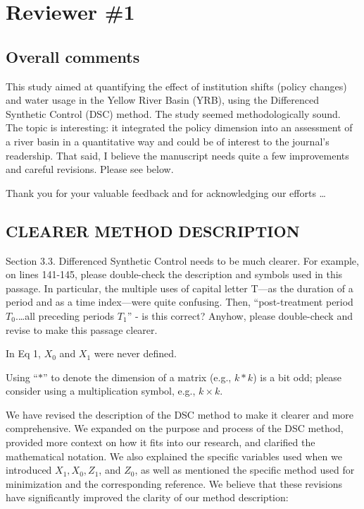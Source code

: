 \section{Reviewer \#1}\label{reviewer_1}

\subsection*{Overall comments}

\RC{} This study aimed at quantifying the effect of institution shifts (policy changes) and water usage in the Yellow River Basin (YRB), using the Differenced Synthetic Control (DSC) method. The study seemed methodologically sound. The topic is interesting: it integrated the policy dimension into an assessment of a river basin in a quantitative way and could be of interest to the journal's readership. That said, I believe the manuscript needs quite a few improvements and careful revisions. Please see below.

\AR{} Thank you for your valuable feedback and for acknowledging our efforts \dots

\subsection{CLEARER METHOD DESCRIPTION}\label{sec:1-1}

\RC{} Section 3.3. Differenced Synthetic Control needs to be much clearer. For example, on lines 141-145, please double-check the description and symbols used in this passage. In particular, the multiple uses of capital letter T—as the duration of a period and as a time index—were quite confusing. Then, ``post-treatment period $T_0$.\ldots all preceding periods $T_1$'' - is this correct? Anyhow, please double-check and revise to make this passage clearer.

\RC{} In Eq 1, $X_0$ and $X_1$ were never defined.

\RC{} Using ``$*$'' to denote the dimension of a matrix (e.g., $k*k$) is a bit odd; please consider using a multiplication symbol, e.g., $k \times k$.

\AR{} We have revised the description of the DSC method to make it clearer and more comprehensive. We expanded on the purpose and process of the DSC method, provided more context on how it fits into our research, and clarified the mathematical notation. We also explained the specific variables used when we introduced $X_1, X_0, Z_1$, and $Z_0$, as well as mentioned the specific method used for minimization and the corresponding reference. We believe that these revisions have significantly improved the clarity of our method description:

